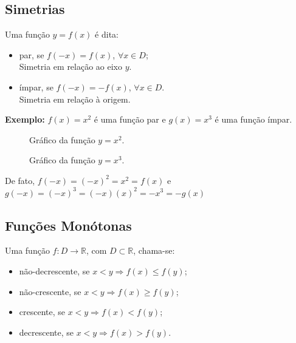 \documentclass[oneside,a4paper,12pt]{article}
\begin{document}
\subsection{Simetrias}

Uma função $y=f(x)$ é dita:
\begin{itemize}
	\item par, se $f(-x) = f(x)$, $\forall x \in D$; \\ Simetria em relação ao eixo $y$.
	\item ímpar, se $f(-x) = -f(x)$, $\forall x \in D$. \\ Simetria em relação à origem.
\end{itemize}

\textbf{Exemplo: } $f(x)=x^2$ é uma função par e $g(x) = x^3$ é uma função ímpar.

\begin{figure}[h]
	\centering
	\caption{Gráfico da função $y = x^2$.}
\end{figure}

\begin{figure}[h]
	\centering
	\caption{Gráfico da função $y = x^3$.}
\end{figure}


De fato, $f(-x) = (-x)^2 = x^2 = f(x)$ e $g(-x) = (-x)^3 = (-x)(x)^2 = -x^3=-g(x)$

\subsection{Funções Monótonas}
Uma função $f:D \rightarrow \mathbb{R}$, com $D \subset \mathbb{R}$, chama-se:
\begin{itemize}
	\item não-decrescente, se $x<y \Rightarrow f(x) \leq f(y)$;
	\item não-crescente, se $x<y \Rightarrow f(x) \geq f(y)$;
	\item crescente, se $x<y \Rightarrow f(x) < f(y)$;
	\item decrescente, se $x<y \Rightarrow f(x) > f(y)$.
\end{itemize}
\end{document}
